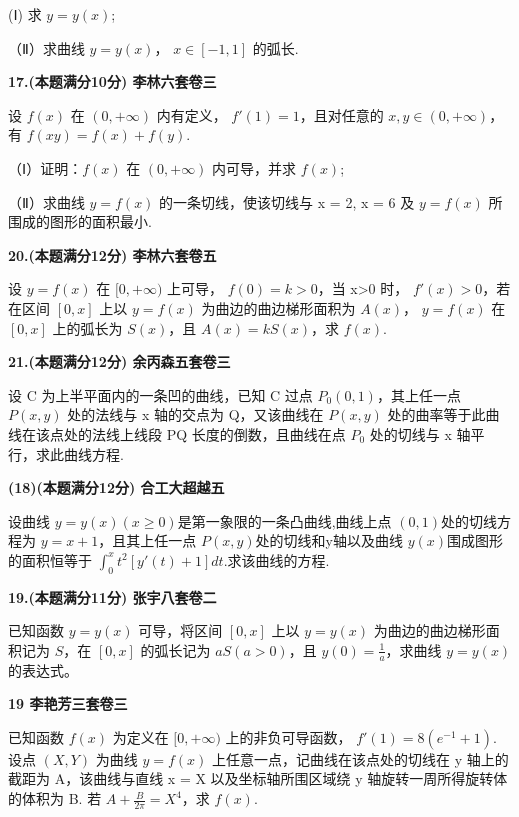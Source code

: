 \documentclass[a4paper,12pt]{article}
\begin{document}
(Ⅰ) 求 $y = y(x)$;

（Ⅱ）求曲线 $y = y(x)$， $x \in [-1, 1]$ 的弧长.

\vspace{0.5cm}

\textbf{17.(本题满分10分) 李林六套卷三}

设 $f(x)$ 在 $(0, +\infty)$ 内有定义， $f'(1) = 1$，且对任意的 $x, y \in (0, +\infty)$，有 $f(xy) = f(x) + f(y)$.

（Ⅰ）证明：$f(x)$ 在 $(0,+\infty)$ 内可导，并求 $f(x)$;

（Ⅱ）求曲线 $y = f(x)$ 的一条切线，使该切线与 x = 2, x = 6 及 $y = f(x)$ 所围成的图形的面积最小.

\vspace{0.5cm}

\textbf{20.(本题满分12分) 李林六套卷五}

设 $y=f(x)$ 在 $[0,+\infty)$ 上可导， $f(0)=k>0$，当 x>0 时， $f'(x)>0$，若在区间 $[0,x]$ 上以 $y=f(x)$ 为曲边的曲边梯形面积为 $A(x)$， $y=f(x)$ 在 $[0,x]$ 上的弧长为 $S(x)$，且 $A(x)=kS(x)$，求 $f(x)$.

\vspace{0.5cm}

\textbf{21.(本题满分12分) 余丙森五套卷三}

设 C 为上半平面内的一条凹的曲线，已知 C 过点 $P_{0}(0,1)$，其上任一点 $P(x,y)$ 处的法线与 x 轴的交点为 Q，又该曲线在 $P(x,y)$ 处的曲率等于此曲线在该点处的法线上线段 PQ 长度的倒数，且曲线在点 $P_{0}$ 处的切线与 x 轴平行，求此曲线方程.

\vspace{0.5cm}

\textbf{(18)(本题满分12分) 合工大超越五}

设曲线 $y=y(x)(x\geq0)$是第一象限的一条凸曲线,曲线上点 $(0,1)$处的切线方程为 $y=x+1$，且其上任一点 $P(x,y)$处的切线和y轴以及曲线 $y(x)$围成图形的面积恒等于 $\int_{0}^{x}t^{2}[y'(t)+1]dt$.求该曲线的方程.

\vspace{0.5cm}

\textbf{19.(本题满分11分) 张宇八套卷二}

已知函数 $y = y(x)$ 可导，将区间 $[0, x]$ 上以 $y = y(x)$ 为曲边的曲边梯形面积记为 $S$，在 $[0, x]$ 的弧长记为 $aS(a > 0)$，且 $y(0) = \frac{1}{a}$，求曲线 $y = y(x)$ 的表达式。

\vspace{0.5cm}

\textbf{19 李艳芳三套卷三}

已知函数 $f(x)$ 为定义在 $[0, +\infty)$ 上的非负可导函数， $f'(1) = 8(e^{-1} + 1)$. 设点 $(X, Y)$ 为曲线 $y = f(x)$ 上任意一点，记曲线在该点处的切线在 y 轴上的截距为 A，该曲线与直线 x = X 以及坐标轴所围区域绕 y 轴旋转一周所得旋转体的体积为 B. 若 $A + \frac{B}{2\pi} = X^{4}$，求 $f(x)$.
\end{document}
